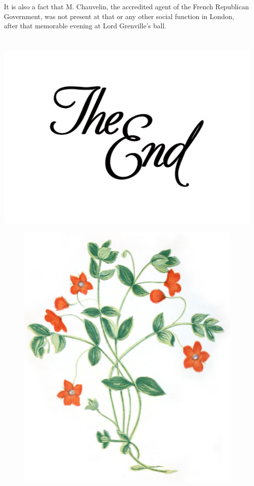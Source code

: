 \documentclass[paper=a5,BCOR=7mm,twoside,DIV=calc,12pt,usegeometry,chapterprefix,endperiod,headings=big]{scrbook}
\begin{document}
It is also a fact that M. Chauvelin, the accredited agent of the French Republican Government, was not present at that or any other social function in London, after that memorable evening at Lord Grenville's ball.
~\\
~\\
~\\
\centering
\includegraphics[width=0.7\linewidth]{theend}
\clearpage
\vfill
\begin{figure}[p!]
\centering
\includegraphics[width=\linewidth]{scarletflowers}
\label{flowers}
\end{figure}
\vfill
\thispagestyle{empty}
\clearpage
\end{document}
